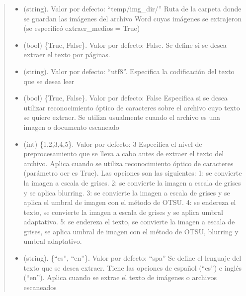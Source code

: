 \documentclass[letterpaper,10pt,openany,spanish]{sphinxmanual}
\begin{document}
\begin{fulllineitems}
\begin{quote}
\begin{description}
\begin{itemize}
\item {} 
 \textendash{} (string). Valor por defecto: “temp/img\_dir/” Ruta de la carpeta         donde se guardan las imágenes del archivo Word cuyas imágenes se extrajeron (se especificó         extraer\_medios = True)

\item {} 
 \textendash{} (bool) \{True, False\}. Valor por defecto: False. Se define si se         desea extraer el texto por páginas.

\item {} 
 \textendash{} (string). Valor por defecto: “utf\sphinxhyphen{}8”. Especifica la codificación         del texto que se desea leer

\item {} 
 \textendash{} (bool) \{True, False\}. Valor por defecto: False Especifica si se desea utilizar reconocimiento         óptico de caracteres sobre el archivo cuyo texto se quiere extraer. Se utiliza         usualmente cuando el archivo es una imagen o documento escaneado

\item {} 
 \textendash{} (int) \{1,2,3,4,5\}. Valor por defecto: 3 Especifica el nivel de preprocesamiento         que se lleva a cabo antes de extraer el texto del archivo. Aplica cuando se utiliza         reconocimiento óptico de caracteres (parámetro ocr es True). Las opciones son las siguientes:           
 1: se convierte la imagen a escala de grises.  
 2: se convierte la imagen a escala de grises y se aplica blurring.  
 3: se convierte la imagen a escala de grises y se aplica el umbral de imagen con el método de OTSU.  
 4: se endereza el texto, se convierte la imagen a escala de grises y se aplica umbral adaptativo.  
 5: se endereza el texto, se convierte la imagen a escala de grises, se aplica umbral de imagen con el método de OTSU, blurring y umbral adaptativo.  


\item {} 
 \textendash{} (string). \{“es”, “en”\}. Valor por defecto: “spa”  Se define el lenguaje del texto que se desea extraer.         Tiene las opciones de español (“es”) e inglés (“en”). Aplica cuando se extrae el texto de         imágenes o archivos escaneados


\end{itemize}
\end{description}
\end{quote}
\end{fulllineitems}
\end{document}
